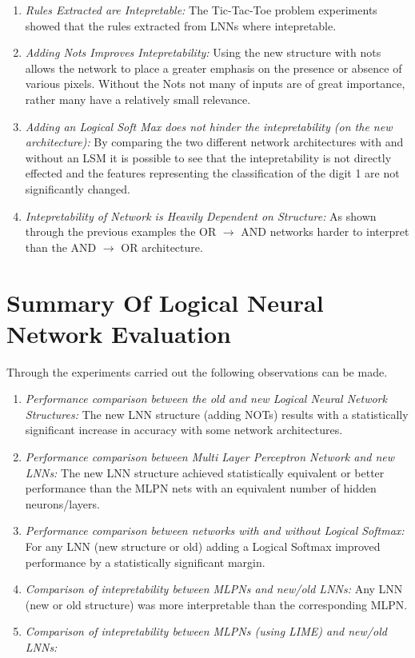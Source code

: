 \begin{enumerate}
	\item \textit{Rules Extracted are Intepretable:} The Tic-Tac-Toe problem experiments showed that the rules extracted from LNNs where intepretable.
	\item \textit{Adding Nots Improves Intepretability:} Using the new structure with nots allows the network to place a greater emphasis on the presence or absence of various pixels. Without the Nots not many of inputs are of great importance, rather many have a relatively small relevance.
	\item \textit{Adding an Logical Soft Max does not hinder the intepretability (on the new architecture):} By comparing the two different network architectures with and without an LSM it is possible to see that the intepretability is not directly effected and the features representing the classification of the digit 1 are not significantly changed.
	\item \textit{Intepretability of Network is Heavily Dependent on Structure:} As shown through the previous examples the OR $\rightarrow$ AND networks harder to interpret than the AND $\rightarrow$ OR architecture.
\end{enumerate}

\section{Summary Of Logical Neural Network Evaluation}
Through the experiments carried out the following observations can be made.

\begin{enumerate}
	\item \textit{Performance comparison between the old and new Logical Neural Network Structures:} The new LNN structure (adding NOTs) results with a statistically significant increase in accuracy with some network architectures.
	\item \textit{Performance comparison between Multi Layer Perceptron Network and new LNNs:} The new LNN structure achieved statistically equivalent or better performance than the MLPN nets with an equivalent number of hidden neurons/layers.
	\item \textit{Performance comparison between networks with and without Logical Softmax:} For any LNN (new structure or old) adding a Logical Softmax improved performance by a statistically significant margin.
	\item \textit{Comparison of intepretability between MLPNs and new/old LNNs:} Any LNN (new or old structure) was more interpretable than the corresponding MLPN.
	\item \textit{Comparison of intepretability between MLPNs (using LIME) and new/old LNNs:}
\end{enumerate}

